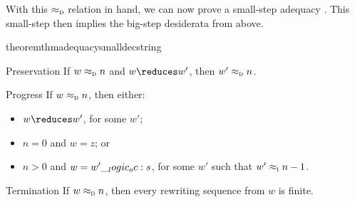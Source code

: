 
%







With this $ \approx\sb{\text{\normalfont\scshape d}} $ relation in hand, we can now prove a small-step adequacy .
This small-step  then implies the big-step desiderata from above.
%
\begin{restatable}[
  name=Small-step adequacy of decrements,
  label=thm:string-rewriting:dec-small-step-adequacy
]{theorem}{thmadequacysmalldecstring}
  \leavevmode
  \begin{thinthmdescription}[leftmargin=0em]
  \item[Preservation]
    If $w \approx\sb{\text{\normalfont\scshape d}} n$ and $w \reduces w'$, then $w' \approx\sb{\text{\normalfont\scshape d}} n$.
  \item[Progress]
    If $w \approx\sb{\text{\normalfont\scshape d}} n$, then either:
    \begin{itemize}[nosep]
    \item $w \reduces w'$, for some $w'$;
    \item $n = 0$ and $w = z$; or
    \item $n > 0$ and $w = w' \__logic_oc: s$, for some $w'$ such that $w' \approx\sb{\text{\normalfont\scshape i}} n-1$.
    \end{itemize}
  \item[Termination]
    If $w \approx\sb{\text{\normalfont\scshape d}} n$, then every rewriting sequence from $w$ is finite.
  \end{thinthmdescription}
\end{restatable}

